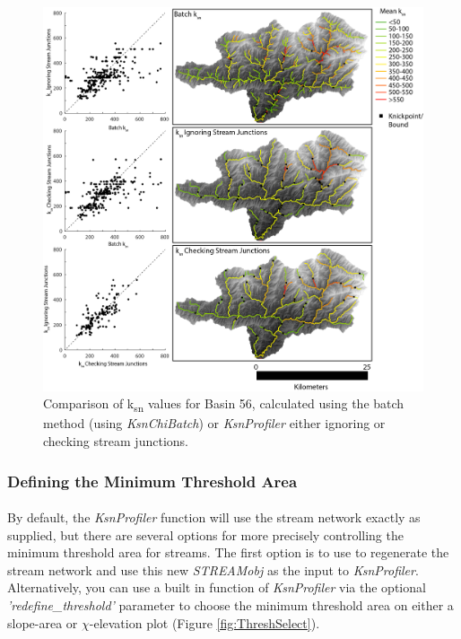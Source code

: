 \begin{figure}[H]
	\includegraphics[width=16.5cm]{PNGs/Basin56_ksn_comparison.png}
	\caption{Comparison of k\textsubscript{sn} values for Basin 56, calculated using the batch method (using \textit{KsnChiBatch})  or \textit{KsnProfiler} either ignoring or checking stream junctions.}
	\label{fig:ProfilerComp}
\end{figure}

\subsubsection{Defining the Minimum Threshold Area}
\paragraph{}By default, the \textit{KsnProfiler} function will use the stream network exactly as supplied, but there are several options for more precisely controlling the minimum threshold area for streams. The first option is to use  to regenerate the stream network and use this new \textit{STREAMobj} as the input to \textit{KsnProfiler}. Alternatively, you can use a built in function of \textit{KsnProfiler} via the optional \textit{'redefine\_threshold'} parameter to choose the minimum threshold area on either a slope-area or $\chi$-elevation plot (Figure \ref{fig:ThreshSelect}).

